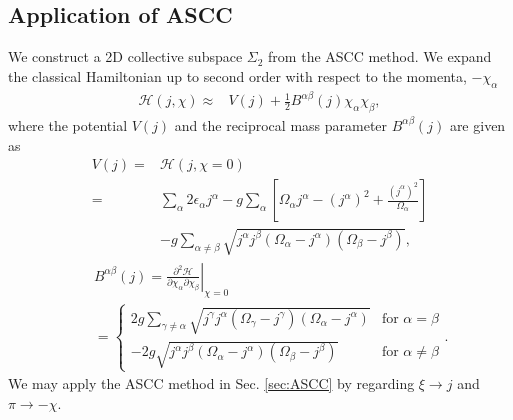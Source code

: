 \documentclass[%
superscriptaddress,
showpacs,
nofootinbib,
amsmath,amssymb,
aps,
prc,
twocolumn,
floatfix ]%
{revtex4-1}
\begin{document}
\subsection{Application of ASCC}

We construct a 2D collective subspace $\Sigma_2$ from the ASCC method.
We expand the classical Hamiltonian up to second order with respect to
the momenta, $-\chi_{\alpha}$
\begin{align}
  \mathcal{H}(j,\chi) \approx& V(j) + \frac{1}{2}B^{\alpha\beta}(j)\chi_{\alpha}\chi_{\beta},
\end{align}
where the potential $V(j)$ and the reciprocal mass parameter
$B^{\alpha\beta}(j)$ are given as
\begin{align}
  V(j) =& \mathcal{H}(j,\chi=0) \nonumber \\
	=& \sum_{\alpha} 2\epsilon_{\alpha}j^{\alpha} - g\sum_{\alpha} \left[ \Omega_{\alpha}j^{\alpha} - (j^{\alpha})^2 +\frac{(j^{\alpha})^2}{\Omega_{\alpha}} \right] \nonumber \\
  &- g\sum_{\alpha\ne \beta} \sqrt{j^{\alpha}j^{\beta}(\Omega_{\alpha}-j^{\alpha})(\Omega_{\beta}-j^{\beta})}, 	
\end{align}
\begin{eqnarray}
&&B^{\alpha\beta}(j) = \left. \frac{\partial^2\mathcal{H}}{\partial\chi_{\alpha}\partial\chi_{\beta}} \right|_{\chi=0} \\
\label{mass}
&&=
	\begin{cases}
2g\sum_{\gamma\ne \alpha} \sqrt{j^{\gamma}j^{\alpha}(\Omega_{\gamma}-j^{\gamma})(\Omega_{\alpha}-j^{\alpha})}
		& \text{for $\alpha=\beta$} \\
-2g\sqrt{j^{\alpha}j^{\beta}(\Omega_{\alpha}-j^{\alpha})(\Omega_{\beta}-j^{\beta})}
		& \text{for $\alpha\ne\beta$}
	\end{cases}. \nonumber
\end{eqnarray}
We may apply the ASCC method in Sec. \ref{sec:ASCC}
by regarding $\xi\to j$ and $\pi\to-\chi$.
\end{document}
